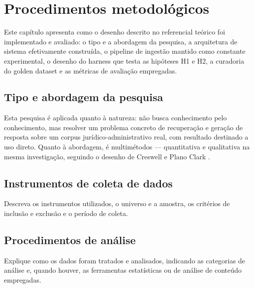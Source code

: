 
\section{Procedimentos metodológicos}

Este capítulo apresenta como o desenho descrito no referencial teórico foi
implementado e avaliado: o tipo e a abordagem da pesquisa, a arquitetura de
sistema efetivamente construída, o pipeline de ingestão mantido como
constante experimental, o desenho do harness que testa as hipóteses H1 e H2,
a curadoria do golden dataset e as métricas de avaliação empregadas.

\subsection{Tipo e abordagem da pesquisa}

Esta pesquisa é aplicada quanto à natureza: não busca conhecimento pelo
conhecimento, mas resolver um problema concreto de recuperação e geração de
resposta sobre um corpus jurídico-administrativo real, com resultado
destinado a uso direto. Quanto à abordagem, é multimétodos --- quantitativa e
qualitativa na mesma investigação, seguindo o desenho de Creswell e Plano
Clark \parencite{creswell2018}.

\subsection{Instrumentos de coleta de dados}

Descreva os instrumentos utilizados, o universo e a amostra, os critérios de
inclusão e exclusão e o período de coleta.

\subsection{Procedimentos de análise}

Explique como os dados foram tratados e analisados, indicando as categorias de
análise e, quando houver, as ferramentas estatísticas ou de análise de conteúdo
empregadas.
